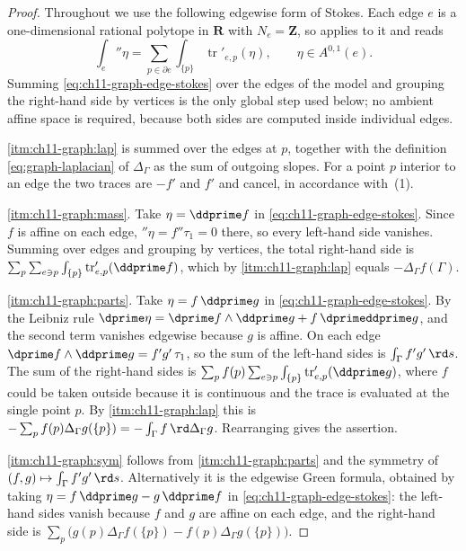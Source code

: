 \begin{proof}
Throughout we use the following edgewise form of Stokes.  Each edge $e$ is a
one-dimensional rational polytope in $\mathbf R$ with $N_e=\mathbf Z$, so
 applies to it and reads
\begin{equation}
\label{eq:ch11-graph-edge-stokes}
 \int_e\dprime\eta
 =\sum_{p\in\partial e}\int_{\{p\}}\operatorname{tr}'_{e,p}(\eta),
 \qquad \eta\in A^{0,1}(e).
\end{equation}
Summing \eqref{eq:ch11-graph-edge-stokes} over the edges of the model and
grouping the right-hand side by vertices is the only global step used below;
no ambient affine space is required, because both sides are computed inside
individual edges.

\cref{itm:ch11-graph:lap} is  summed over the
edges at $p$, together with the definition
\eqref{eq:graph-laplacian} of $\Delta_\Gamma$ as the sum of outgoing slopes.
For a point $p$ interior to an edge the two traces are $-f'$ and $f'$ and
cancel, in accordance with
\,(1).

\cref{itm:ch11-graph:mass}.  Take $\eta=\ddprime f$ in
\eqref{eq:ch11-graph-edge-stokes}.  Since $f$ is affine on each edge,
$\dprime\eta=f''\tau_1=0$ there, so every left-hand side vanishes.  Summing
over edges and grouping by vertices, the total right-hand side is
$\sum_p\sum_{e\ni p}\int_{\{p\}}\operatorname{tr}'_{e,p}(\ddprime f)$,
which by \cref{itm:ch11-graph:lap} equals $-\Delta_\Gamma f(\Gamma)$.

\cref{itm:ch11-graph:parts}.  Take $\eta=f\,\ddprime g$ in
\eqref{eq:ch11-graph-edge-stokes}.  By the Leibniz rule
$\dprime\eta=\dprime f\wedge\ddprime g+f\,\dprimeddprime g$, and the second
term vanishes edgewise because $g$ is affine.  On each edge
$\dprime f\wedge\ddprime g=f'g'\,\tau_1$, so the sum of the left-hand sides
is $\int_\Gamma f'g'\,\rd s$.  The sum of the right-hand sides is
$\sum_pf(p)\sum_{e\ni p}\int_{\{p\}}\operatorname{tr}'_{e,p}(\ddprime g)$,
where $f$ could be taken outside because it is continuous and the trace is
evaluated at the single point $p$.  By \cref{itm:ch11-graph:lap} this is
$-\sum_pf(p)\Delta_\Gamma g(\{p\})=-\int_\Gamma f\,\rd\Delta_\Gamma g$.
Rearranging gives the assertion.

\cref{itm:ch11-graph:sym} follows from \cref{itm:ch11-graph:parts} and the
symmetry of $(f,g)\mapsto\int_\Gamma f'g'\,\rd s$.  Alternatively it is the
edgewise Green formula, obtained by taking
$\eta=f\,\ddprime g-g\,\ddprime f$ in \eqref{eq:ch11-graph-edge-stokes}: the
left-hand sides vanish because $f$ and $g$ are affine on each edge, and the
right-hand side is
$\sum_p\bigl(g(p)\Delta_\Gamma f(\{p\})-f(p)\Delta_\Gamma g(\{p\})\bigr)$.
\end{proof}

